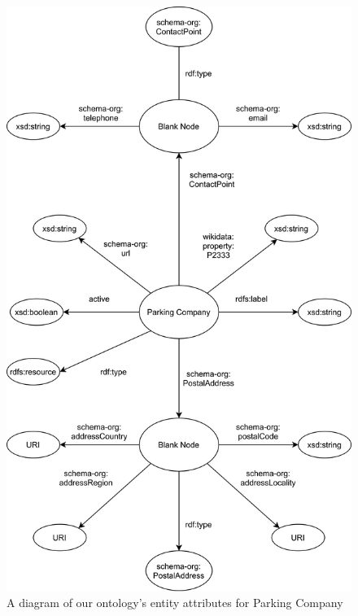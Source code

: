 \begin{figure}[H]
	\centering
	\includegraphics[scale=0.18]{figures/parking-company-attributes.png}
	\caption{A diagram of our ontology's entity attributes for Parking Company}
\end{figure}
